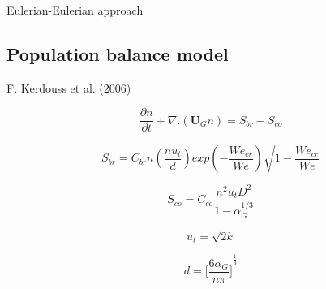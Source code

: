 \documentclass{beamer}
\begin{document}
\begin{frame}{Eulerian-Eulerian approach}

\end{frame}


\subsection{Population balance model}

\begin{frame}{F. Kerdouss et al. (2006)}

\begin{equation} 
\frac{\partial n}{\partial t}+\nabla.({\textbf{U}_G}n) = S_{br}-S_{co} 
\end{equation}

\pause


\begin{equation}
S_{br} = C_{br} n (\frac{n u_t}{d}) exp (-\frac{We_{cr}}{We})\sqrt{1-\frac{We_{cr}}{We}}
\end{equation}

\pause

\begin{equation}
S_{co} = C_{co}\frac{n^2 u_t {D}^2}{1-\alpha_{G}^{1/3}}
\end{equation} 

\pause

\begin{equation}
u_t = \sqrt{2k}
\end{equation}

\pause

\begin{equation} 
\boxed{d = {\bigg[ \frac{6\alpha_{G}}{n{\pi}} \bigg]}^{\frac{1}{3}} } 
\end{equation} 
 
  
\end{frame}
\end{document}

